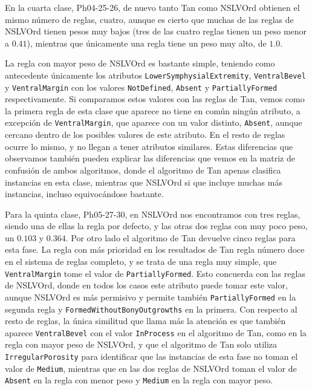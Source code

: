 En la cuarta clase, Ph04-25-26, de nuevo tanto Tan como NSLVOrd obtienen el mismo número de reglas, cuatro, aunque es cierto que muchas de las reglas de NSLVOrd tienen pesos muy bajos (tres de las cuatro reglas tienen un peso menor a $0.41$), mientras que únicamente una regla tiene un peso muy alto, de $1.0$.

La regla con mayor peso de NSLVOrd es bastante simple, teniendo como antecedente únicamente los atributos \texttt{LowerSymphysialExtremity}, \texttt{VentralBevel} y \texttt{VentralMargin} con los valores \texttt{NotDefined}, \texttt{Absent} y \texttt{PartiallyFormed} respectivamente. Si comparamos estos valores con las reglas de Tan, vemos como la primera regla de esta clase que aparece no tiene en común ningún atributo, a excepción de \texttt{VentralMargin}, que aparece con un valor distinto, \texttt{Absent}, aunque cercano dentro de los posibles valores de este atributo. En el resto de reglas ocurre lo mismo, y no llegan a tener atributos similares. Estas diferencias que observamos también pueden explicar las diferencias que vemos en la matriz de confusión de ambos algoritmos, donde el algoritmo de Tan apenas clasifica instancias en esta clase, mientras que NSLVOrd si que incluye muchas más instancias, incluso equivocándose bastante.

Para la quinta clase, Ph05-27-30, en NSLVOrd nos encontramos con tres reglas, siendo una de ellas la regla por defecto, y las otras dos reglas con muy poco peso, un $0.103$ y $0.364$. Por otro lado el algoritmo de Tan devuelve cinco reglas para esta fase. La regla con más prioridad en los resultados de Tan regla número doce en el sistema de reglas completo, y se trata de una regla muy simple, que \texttt{VentralMargin} tome el valor de \texttt{PartiallyFormed}. Esto concuerda con las reglas de NSLVOrd, donde en todos los casos este atributo puede tomar este valor, aunque NSLVOrd es más permisivo y permite también \texttt{PartiallyFormed} en la segunda regla y \texttt{FormedWithoutBonyOutgrowths} en la primera. Con respecto al resto de reglas, la única similitud que llama más la atención es que también aparece \texttt{VentralBevel} con el valor \texttt{InProcess} en el algoritmo de Tan, como en la regla con mayor peso de NSLVOrd, y que el algoritmo de Tan solo utiliza \texttt{IrregularPorosity} para identificar que las instancias de esta fase no toman el valor de \texttt{Medium}, mientras que en las dos reglas de NSLVOrd toman el valor de \texttt{Absent} en la regla con menor peso y \texttt{Medium} en la regla con mayor peso.

